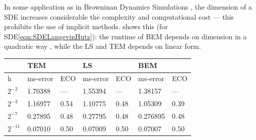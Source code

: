 \documentclass[sort&compress, preprint]{elsarticle}
\theoremstyle{definition}
\theoremstyle{plain}%
\theoremstyle{remark}
\newcommand{\SM}{LS\xspace}
\begin{document}
In some application as in Browninan Dynamics Simulations \cite{Cruz2012}, the dimension of a SDE
increases considerable the complexity and computational cost --- this prohibits the use of implicit methods.
 shows this (for SDE\eqref{eqn:SDELangevinHutz}): the runtime of BEM depends on 
dimension in a quadratic way , while the \SM and TEM depends on linear form.     
\begin{table}[t]
	\centering
	\begin{tabular}{lllllll}
		&        TEM &        	& LS		&           & BEM		 &         \\
		\toprule
		h		& ms-error	 & ECO 		& ms-error	    & ECO		& ms-error	 &	ECO	  \\
		\midrule
		$2^{-2}$	& \num{1.70388}    & ---		&\num{1.55394}		& ---		& \num{1.38157}	& 
		--- \\
		$2^{-3}$	& \num{1.16977}    & \num{0.54}     &\num{1.10775}    & \num{0.48} & \num{1.05309}	& 
		\num{0.39} \\ 
		$2^{-7}$	&\num{0.27895}     & \num{0.48} & \num{0.27795}   & \num{0.48} & \num{0.276895}& 
		\num{0.48} \\
		$2^{-11}$	& \num{0.07010}  & \num{0.50} & \num{0.07009}  & \num{0.50} & \num{0.07007} & 
		\num{0.50} \\

\end{tabular}
\end{table}
\end{document}
